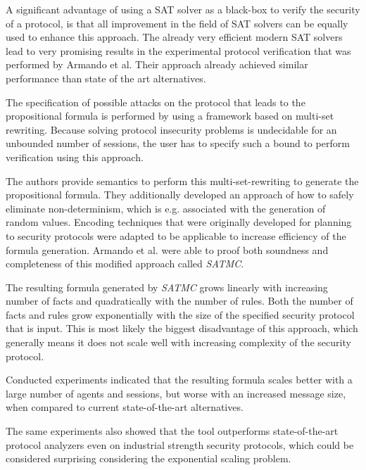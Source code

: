 \documentclass[a4paper,UKenglish]{lipics-v2018}
\begin{document}
A significant advantage of using a SAT solver as a black-box to verify the security of a protocol, is that all improvement in the field of SAT solvers can be equally used to enhance this approach. The already very efficient modern SAT solvers lead to very promising results in the experimental protocol verification that was performed by Armando et al. Their approach already achieved similar performance than state of the art alternatives.
\cite{sat}

The specification of possible attacks on the protocol that leads to the propositional formula is performed by using a framework based on multi-set rewriting. Because solving protocol insecurity problems is undecidable for an unbounded number of sessions, the user has to specify such a bound to perform verification using this approach.
\cite{sat}


The authors provide semantics to perform this multi-set-rewriting to generate the propositional formula. They additionally developed an approach of how to safely eliminate non-determinism, which is e.g. associated with the generation of random values.
Encoding techniques that were originally developed for planning to security protocols were adapted to be applicable to increase efficiency of the formula generation. Armando et al. were able to proof both soundness and completeness of this modified approach called \textit{SATMC}.
\cite{sat}

The resulting formula generated by \textit{SATMC} grows linearly with increasing number of facts and quadratically with the number of rules. Both the number of facts and rules grow exponentially with the size of the specified security protocol that is input. This is most likely the biggest disadvantage of this approach, which generally means it does not scale well with increasing complexity of the security protocol.
\cite{sat}

Conducted experiments indicated that the resulting formula scales better with a large number of agents and sessions, but worse with an increased message size, when compared to current state-of-the-art alternatives.
\cite{sat}


The same experiments also showed that the tool outperforms state-of-the-art protocol analyzers even on industrial strength security protocols, which could be considered surprising considering the exponential scaling problem.
\cite{sat}
\end{document}
